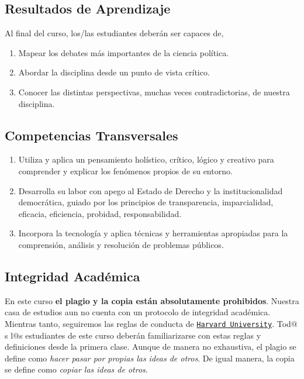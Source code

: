 \documentclass[letterpaper]{article}
\begin{document}
\subsection*{Resultados de Aprendizaje}

Al final del curso, los/las estudiantes deber\'an ser capaces de,

\begin{enumerate}
  \item Mapear los debates m\'as importantes de la ciencia pol\'itica.
  \item Abordar la disciplina desde un punto de vista cr\'itico.
  \item Conocer las distintas perspectivas, muchas veces contradictorias, de nuestra disciplina.
\end{enumerate}

\subsection*{Competencias Transversales}


\begin{enumerate}
	\item Utiliza y aplica un pensamiento hol\'istico, cr\'itico, l\'ogico y creativo para comprender y explicar los fen\'omenos propios de su entorno.
	\item Desarrolla su labor con apego al Estado de Derecho y la institucionalidad democr\'atica, guiado por los principios de transparencia, imparcialidad, eficacia, eficiencia, probidad, responsabilidad. 
	\item Incorpora la tecnolog\'ia y aplica t\'ecnicas y herramientas apropiadas para la comprensi\'on, an\'alisis y resoluci\'on de problemas p\'ublicos.
\end{enumerate}


\subsection*{Integridad Acad\'emica}

En este curso {\bf el plagio y la copia est\'an absolutamente prohibidos}. Nuestra casa de estudios aun no cuenta con un protocolo de integridad acad\'emica. Mientras tanto, seguiremos las reglas de conducta de  \href{www.extension.harvard.edu/resources-policies/student-conduct/academic-integrity}{\texttt{Harvard University}}. Tod$@$s l$@$s estudiantes de este curso deber\'an familiarizarse con estas reglas y definiciones desde la primera clase. Aunque de manera no exhaustiva, el plagio se define como \emph{hacer pasar por propias las ideas de otros}. De igual manera, la copia se define como \emph{copiar las ideas de otros}. 
\end{document}
